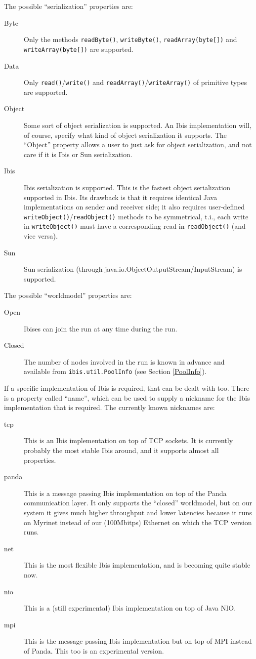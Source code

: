 \documentclass[10pt]{article}
\begin{document}
The possible ``serialization'' properties are:
\begin{description}
\item[Byte]
Only the methods \texttt{readByte()}, \texttt{writeByte()}, \texttt{readArray(byte[])} and \texttt{writeArray(byte[])} are supported.
\item[Data]
Only \texttt{read()}/\texttt{write()} and \texttt{readArray()}/\texttt{writeArray()} of primitive types are supported.
\item[Object]
Some sort of object serialization is supported. An Ibis implementation
will, of course, specify what kind of object serialization it supports.
The ``Object'' property allows a user to just ask for object
serialization, and not care if it is Ibis or Sun serialization.
\item[Ibis]
Ibis serialization is supported.
This is the fastest object serialization supported in Ibis. Its drawback
is that it requires identical Java implementations on sender and
receiver side; it also requires user-defined
\texttt{writeObject()}/\texttt{readObject()} methods to be symmetrical, t.i., 
each write in \texttt{writeObject()} must have a corresponding read
in \texttt{readObject()} (and vice versa).
\item[Sun]
Sun serialization (through java.io.ObjectOutputStream/InputStream) is
supported.
\end{description}

\noindent
The possible ``worldmodel'' properties are:
\begin{description}
\item[Open]
Ibises can join the run at any time during the run.
\item[Closed]
The number of nodes involved in the run is known in advance and
available from \texttt{ibis.util.PoolInfo} (see Section \ref{PoolInfo}).
\end{description}

\noindent
If a specific implementation of Ibis is required, that can be dealt with too.
There is a property called ``name'', which can be used to supply a nickname
for the Ibis implementation that is required.
The currently known nicknames are:
\begin{description}
\item[tcp]
This is an Ibis implementation on top of TCP sockets. It is currently 
probably the most stable Ibis around, and it supports almost all properties.
\item[panda]
This is a message passing Ibis implementation on top of the Panda
communication layer. It only supports the ``closed'' worldmodel,
but on our system it gives much higher throughput and lower latencies
because it runs on Myrinet instead of our (100Mbitps) Ethernet on which
the TCP version runs.
\item[net]
This is the most flexible Ibis implementation, and is becoming quite
stable now.
\item[nio]
This is a (still experimental) Ibis implementation on top of Java NIO.
\item[mpi]
This is the message passing Ibis implementation but on top of MPI instead
of Panda. This too is an experimental version.
\end{description}
\end{document}
